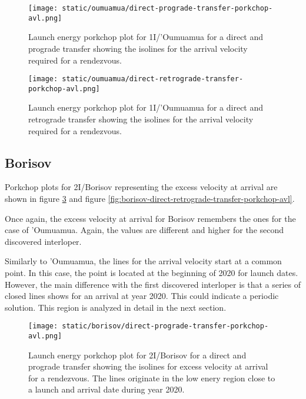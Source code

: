 \newpage
\begin{figure}[H]
  \centering
  \texttt{[image: static/oumuamua/direct-prograde-transfer-porkchop-avl.png]}
        \caption[Direct and prograde launch energy porkchop for 'Oumuamua]{Launch energy porkchop plot for 1I/'Oumuamua for a direct and prograde transfer showing the isolines for the arrival velocity required for a rendezvous.}
  \label{fig:oumuamua-direct-prograde-transfer-porkchop-avl}
\end{figure}

\begin{figure}[H]
  \centering
  \texttt{[image: static/oumuamua/direct-retrograde-transfer-porkchop-avl.png]}
        \caption[Direct and prograde launch energy porkchop for
        'Oumuamua]{Launch energy porkchop plot for 1I/'Oumuamua for a direct and
        retrograde transfer showing the isolines for the arrival velocity required for a rendezvous.}
  \label{fig:oumuamua-direct-retrograde-transfer-porkchop-avl}
\end{figure}

\subsection{Borisov}

Porkchop plots for 2I/Borisov representing the excess velocity at arrival are
shown in figure \ref{fig:borisov-direct-prograde-transfer-porkchop-avl} and figure
\ref{fig:borisov-direct-retrograde-transfer-porkchop-avl}.

Once again, the excess velocity at arrival for Borisov remembers the ones for
the case of 'Oumuamua. Again, the values are different and higher for the second
discovered interloper.

Similarly to 'Oumuamua, the lines for the arrival velocity start at a common
point. In this case, the point is located at the beginning of 2020 for launch
dates. However, the main difference with the first discovered interloper is that
a series of closed lines shows for an arrival at year 2020. This could indicate
a periodic solution. This region is analyzed in detail in the next section.

\newpage
\begin{figure}[H]
  \centering
  \texttt{[image: static/borisov/direct-prograde-transfer-porkchop-avl.png]}
        \caption[Direct and prograde arrival excess velocity porkchop for
        Borisov]{Launch energy porkchop plot for 2I/Borisov for a direct and
        prograde transfer showing the isolines for excess velocity at arrival
        for a rendezvous. The lines originate in the low enery region close to a
        launch and arrival date during year 2020.}
  \label{fig:borisov-direct-prograde-transfer-porkchop-avl}
\end{figure}

